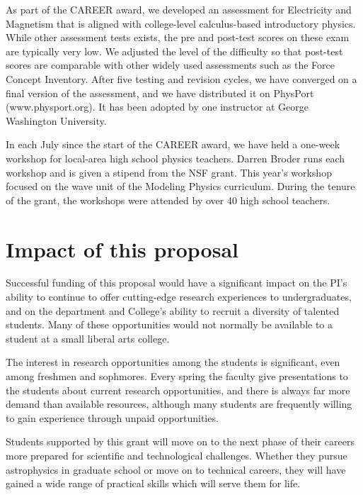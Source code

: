 \documentclass[11pt, preprint]{aastex}
\begin{document}
As part of the CAREER award, we developed an assessment for Electricity and Magnetism that is aligned with college-level
calculus-based introductory physics.  While other assessment tests exists, the pre and post-test scores on these exam are typically very
low.  We adjusted the level of the difficulty so that post-test scores
are comparable with other widely used assessments such as the Force Concept Inventory.  After five testing and revision cycles, we have
converged on a final version of the assessment, and we have distributed it on PhysPort (www.physport.org). It has been adopted by one instructor at George Washington University.


 
In each July since the start of the CAREER award, we have held a one-week workshop for local-area high
school physics teachers.  
Darren Broder runs each workshop and is given a  stipend from the NSF
grant.  This year's workshop focused on the wave unit of the Modeling
Physics curriculum.  During the tenure of the grant, the workshops
were attended by over 40 high school teachers.



\section{Impact of this proposal}

Successful funding of this proposal would have a significant impact on the PI's
ability to continue to offer cutting-edge research experiences to
undergraduates, and on the department and College's ability to recruit a
diversity of talented students.  Many of these opportunities would not normally
be available to a student at a small liberal arts college.

The interest in research opportunities among the students is significant, even
among freshmen and sophmores.  Every spring the faculty give presentations to
the students about current research opportunities, and there is always far more
demand than available resources, although many students are frequently willing
to gain experience through unpaid opportunities.

Students supported by this grant will move on to the next phase of their careers
more prepared for scientific and technological challenges.  Whether they pursue
astrophysics in graduate school or move on to technical careers, they will have
gained a wide range of practical skills which will serve them for life.
				
\end{document}

